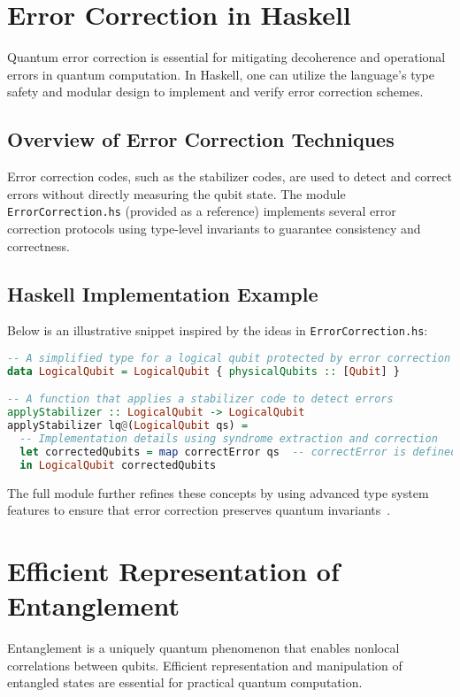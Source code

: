 \documentclass[12pt]{article}
\begin{document}
\section{Error Correction in Haskell}
\label{sec:errcorr}
Quantum error correction is essential for mitigating decoherence and operational errors in quantum computation. In Haskell, one can utilize the language’s type safety and modular design to implement and verify error correction schemes.

\subsection{Overview of Error Correction Techniques}
Error correction codes, such as the stabilizer codes, are used to detect and correct errors without directly measuring the qubit state. The module \texttt{ErrorCorrection.hs} (provided as a reference) implements several error correction protocols using type-level invariants to guarantee consistency and correctness.

\subsection{Haskell Implementation Example}
Below is an illustrative snippet inspired by the ideas in \texttt{ErrorCorrection.hs}:
\begin{lstlisting}[language=Haskell]
-- A simplified type for a logical qubit protected by error correction
data LogicalQubit = LogicalQubit { physicalQubits :: [Qubit] }

-- A function that applies a stabilizer code to detect errors
applyStabilizer :: LogicalQubit -> LogicalQubit
applyStabilizer lq@(LogicalQubit qs) = 
  -- Implementation details using syndrome extraction and correction
  let correctedQubits = map correctError qs  -- correctError is defined elsewhere
  in LogicalQubit correctedQubits
\end{lstlisting}
The full module further refines these concepts by using advanced type system features to ensure that error correction preserves quantum invariants~\cite{nielsen2000quantum}.

\section{Efficient Representation of Entanglement}
\label{sec:entanglement}
Entanglement is a uniquely quantum phenomenon that enables nonlocal correlations between qubits. Efficient representation and manipulation of entangled states are essential for practical quantum computation.
\end{document}
